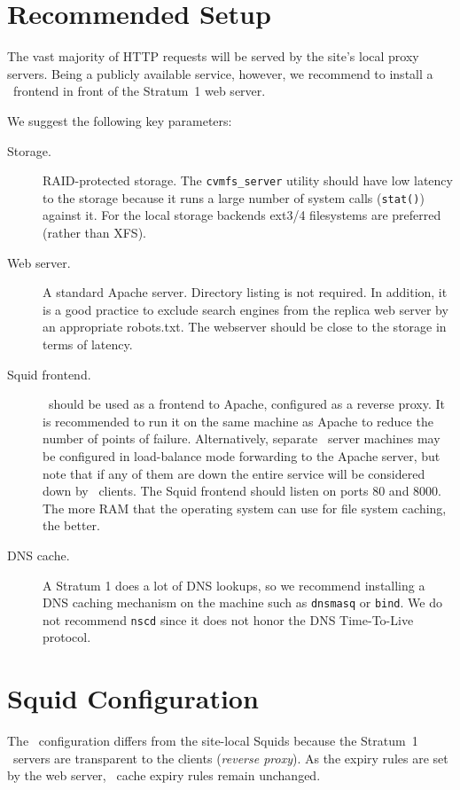 \section{Recommended Setup}
The vast majority of HTTP requests will be served by the site's local
proxy servers.
Being a publicly available service, however, we recommend to install
a \squid\ frontend in front of the Stratum~1 web server.

We suggest the following key parameters:
\begin{description}
	\item[Storage.] 
		RAID-protected storage.
		The \texttt{cvmfs\_server} utility should have low latency to the storage because it runs a large number of system calls (\texttt{stat()}) against it.
		For the local storage backends ext3/4 filesystems are preferred (rather than XFS).
	\item[Web server.]
		A standard Apache server.
		Directory listing is not required.
		In addition, it is a good practice to exclude search engines from the replica web server by an appropriate robots.txt.
		The webserver should be close to the storage in terms of latency.
	\item[Squid frontend.]
		\squid\ should be used as a frontend to Apache, configured as a reverse proxy.
		It is recommended to run it on the same machine as Apache to reduce the number of points of failure.
		Alternatively, separate \squid\ server machines may be configured in load-balance mode forwarding to the Apache server, but note that if any of them are down the entire service will be considered down by \cvmfs\ clients.
		The Squid frontend should listen on ports 80 and 8000.
		The more RAM that the operating system can use for file system caching, the better.

	\item[DNS cache.]
		A Stratum 1 does a lot of DNS lookups, so we recommend installing a DNS caching mechanism on the machine such as \texttt{dnsmasq} or \texttt{bind}.
		We do not recommend \texttt{nscd} since it does not honor the DNS Time-To-Live protocol.
\end{description}

\section{Squid Configuration}
The \squid\ configuration differs from the site-local Squids
because the Stratum~1 \squid\ servers are transparent to the clients
(\emph{reverse proxy}).
As the expiry rules are set by the web server, \squid\ cache expiry
rules remain unchanged.

